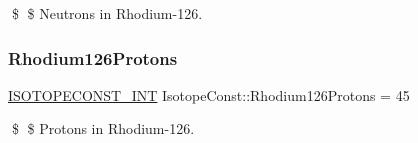 \$ \$ Neutrons in Rhodium-\/126. \mbox{\label{group___isotope_const-_rhodium-_rh126_ga2c1ae54ecdd768258ec8f6c2241a1b90}} 
\subsubsection{\texorpdfstring{Rhodium126\+Protons}{Rhodium126Protons}}
{\footnotesize\ttfamily \mbox{\hyperlink{group___isotope_const-_macros_ga5f18360b3e99483a35c32d789e62621c}{I\+S\+O\+T\+O\+P\+E\+C\+O\+N\+S\+T\+\_\+\+I\+NT}} Isotope\+Const\+::\+Rhodium126\+Protons = 45}

\$ \$ Protons in Rhodium-\/126. 